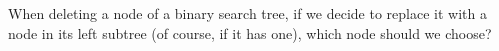 When deleting a node of a binary search tree, if we decide to replace
it with a node in its left subtree (of course, if it has one), which
node should we choose?
